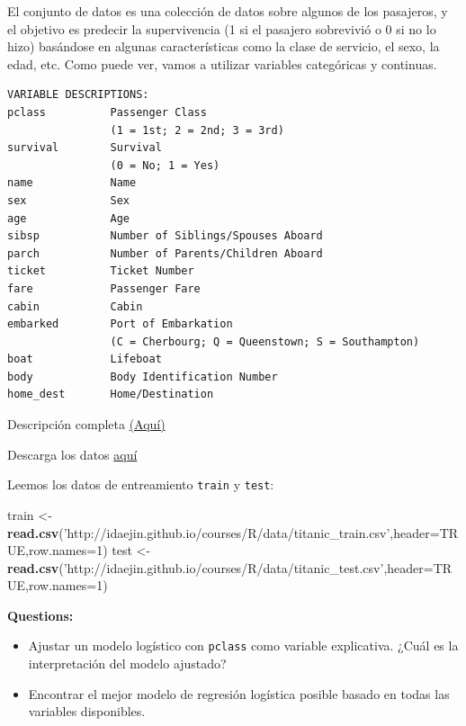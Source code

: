\documentclass[]{book}
\newenvironment{Shaded}{\begin{snugshade}}{\end{snugshade}}
\newcommand{\KeywordTok}[1]{\textcolor[rgb]{0.13,0.29,0.53}{\textbf{#1}}}
\newcommand{\DataTypeTok}[1]{\textcolor[rgb]{0.13,0.29,0.53}{#1}}
\newcommand{\DecValTok}[1]{\textcolor[rgb]{0.00,0.00,0.81}{#1}}
\newcommand{\StringTok}[1]{\textcolor[rgb]{0.31,0.60,0.02}{#1}}
\newcommand{\OtherTok}[1]{\textcolor[rgb]{0.56,0.35,0.01}{#1}}
\newcommand{\NormalTok}[1]{#1}
\begin{document}
El conjunto de datos es una colección de datos sobre algunos de los
pasajeros, y el objetivo es predecir la supervivencia (1 si el pasajero
sobrevivió o 0 si no lo hizo) basándose en algunas características como
la clase de servicio, el sexo, la edad, etc. Como puede ver, vamos a
utilizar variables categóricas y continuas.

\begin{verbatim}
VARIABLE DESCRIPTIONS:
pclass          Passenger Class
                (1 = 1st; 2 = 2nd; 3 = 3rd)
survival        Survival
                (0 = No; 1 = Yes)
name            Name
sex             Sex
age             Age
sibsp           Number of Siblings/Spouses Aboard
parch           Number of Parents/Children Aboard
ticket          Ticket Number
fare            Passenger Fare
cabin           Cabin
embarked        Port of Embarkation
                (C = Cherbourg; Q = Queenstown; S = Southampton)
boat            Lifeboat
body            Body Identification Number
home_dest       Home/Destination
\end{verbatim}

Descripción completa
\href{http://biostat.mc.vanderbilt.edu/wiki/pub/Main/DataSets/titanic3info.txt}{(Aquí)}

Descarga los datos
\href{http://idaejin.github.io/courses/R/data/titanic.zip}{aquí}

Leemos los datos de entreamiento \texttt{train} y \texttt{test}:

\begin{Shaded}
\begin{Highlighting}[]
\NormalTok{train <-}\StringTok{ }\KeywordTok{read.csv}\NormalTok{(}\StringTok{'http://idaejin.github.io/courses/R/data/titanic_train.csv'}\NormalTok{,}\DataTypeTok{header=}\OtherTok{TRUE}\NormalTok{,}\DataTypeTok{row.names=}\DecValTok{1}\NormalTok{)}
\NormalTok{ test <-}\StringTok{ }\KeywordTok{read.csv}\NormalTok{(}\StringTok{'http://idaejin.github.io/courses/R/data/titanic_test.csv'}\NormalTok{,}\DataTypeTok{header=}\OtherTok{TRUE}\NormalTok{,}\DataTypeTok{row.names=}\DecValTok{1}\NormalTok{)}
\end{Highlighting}
\end{Shaded}

\textbf{Questions:}

\begin{itemize}
\item
  Ajustar un modelo logístico con \texttt{pclass} como variable
  explicativa. ¿Cuál es la interpretación del modelo ajustado?
\item
  Encontrar el mejor modelo de regresión logística posible basado en
  todas las variables disponibles.
\end{itemize}
\end{document}
